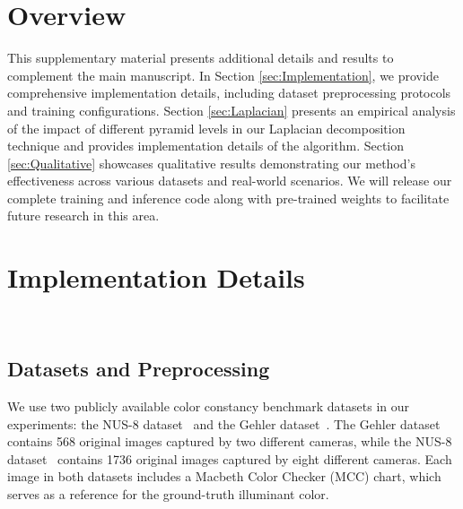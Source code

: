 \label{sec:appendix_section}

\section*{Overview}
This supplementary material presents additional details and results to complement the main manuscript. In Section \ref{sec:Implementation}, we provide comprehensive implementation details, including dataset preprocessing protocols and training configurations. Section \ref{sec:Laplacian} presents an empirical analysis of the impact of different pyramid levels in our Laplacian decomposition technique and provides implementation details of the algorithm. Section \ref{sec:Qualitative} showcases qualitative results demonstrating our method's effectiveness across various datasets and real-world scenarios. We will release our complete training and inference code along with pre-trained weights to facilitate future research in this area.

\section{Implementation Details}~\label{sec:Implementation}
\subsection{Datasets and Preprocessing}
We use two publicly available color constancy benchmark datasets in our experiments: the NUS-8
dataset~\cite{cheng2014illuminant} and the Gehler dataset~\cite{4587765}. The Gehler dataset~\cite{4587765} contains 568 original images captured by two different cameras, while the NUS-8 dataset~\cite{cheng2014illuminant} contains 1736 original images captured by eight different cameras. Each image in both datasets includes a Macbeth Color Checker (MCC) chart, which serves as a reference for the ground-truth illuminant color.





